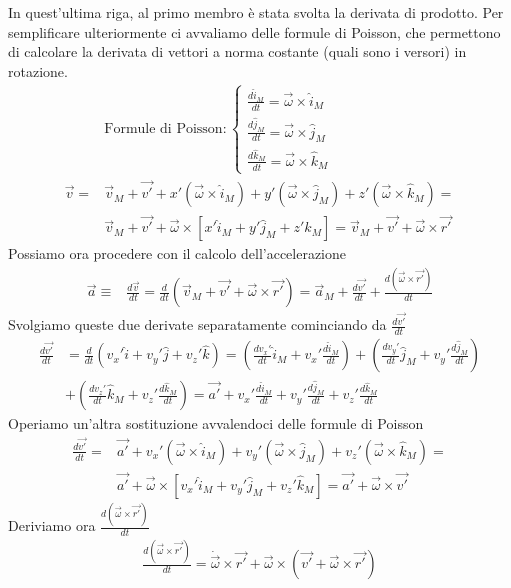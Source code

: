 In quest'ultima riga, al primo membro è stata svolta la derivata di prodotto. Per semplificare ulteriormente ci avvaliamo delle formule di Poisson, che permettono di calcolare la derivata di vettori a norma costante (quali sono i versori) in rotazione. 
\begin{align*}
	&\text{Formule di Poisson}:
	\begin{cases}
		\frac{d\hat{i}_M}{dt} = \vec{\omega} \times \hat{i}_M\\
		\frac{d\hat{j}_M}{dt} = \vec{\omega} \times \hat{j}_M\\
		\frac{d\hat{k}_M}{dt} = \vec{\omega} \times \hat{k}_M
	\end{cases}\\
\vec{v} =& \vec{v}_M + \vec{v'}+x'(\vec{\omega} \times \hat{i}_M) + y'(\vec{\omega} \times \hat{j}_M) + z'(\vec{\omega} \times \hat{k}_M) =\\
 &\vec{v}_M + \vec{v'}+\vec{\omega} \times [x'\hat{i}_M + y' \hat{j}_M + z'\hat{k}_M] = \vec{v}_M + \vec{v'} + \vec{\omega} \times \vec{r'}
\end{align*}
Possiamo ora procedere con il calcolo dell'accelerazione
\begin{align*}
	\vec{a} \equiv& \frac{d\vec{v}}{dt}= \frac{d}{dt}(\vec{v}_M+ \vec{v'} + \vec{\omega} \times \vec{r'})= \vec{a}_M + \frac{d\vec{v'}}{dt}+ \frac{d(\vec{\omega} \times \vec{r'})}{dt}
\end{align*}
Svolgiamo queste due derivate separatamente cominciando da $\frac{d\vec{v'}}{dt}$
\begin{align*}
	\frac{d\vec{v'}}{dt} &= \frac{d}{dt}(v_x' \hat{i}+v_y'\hat{j}+v_z'\hat{k}) = (\frac{dv_x'}{dt}\hat{i}_M + v_x'\frac{d\hat{i}_M}{dt}) + (\frac{dv_y'}{dt}\hat{j}_M + v_y'\frac{d\hat{j}_M}{dt})\\ &+(\frac{dv_z'}{dt}\hat{k}_M + v_z'\frac{d\hat{k}_M}{dt}) =  \vec{a'} +  v_x'\frac{d\hat{i}_M}{dt} + v_y'\frac{d\hat{j}_M}{dt} + v_z'\frac{d\hat{k}_M}{dt}
\end{align*}
Operiamo un'altra sostituzione avvalendoci delle formule di Poisson
\begin{align*}
		\frac{d\vec{v'}}{dt} =&\vec{a'} + v_x'(\vec{\omega} \times \hat{i}_M) + v_y'(\vec{\omega} \times \hat{j}_M) + v_z'(\vec{\omega} \times \hat{k}_M) =\\
	&\vec{a'}+\vec{\omega} \times [v_x'\hat{i}_M + v_y' \hat{j}_M + v_z'\hat{k}_M] = \vec{a'} + \vec{\omega} \times \vec{v'}
\end{align*}
Deriviamo ora $\frac{d(\vec{\omega} \times \vec{r'})}{dt}$
\begin{align*}
\frac{d(\vec{\omega} \times \vec{r'})}{dt} = \dot{\vec{\omega}}\times \vec{r'}+ \vec{\omega}\times (\vec{v'} + \vec{\omega}\times\vec{r'}) 
\end{align*}
